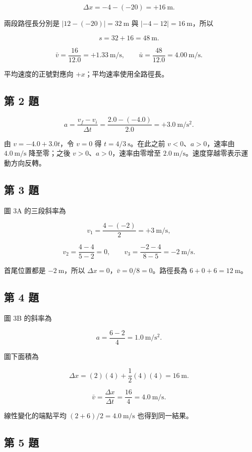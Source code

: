 \documentclass[11pt,a4paper]{article}
\begin{document}
\[
\Delta x=-4-(-20)=+16\ \mathrm m.
\]

兩段路徑長分別是 \(|12-(-20)|=32\ \mathrm m\) 與 \(|-4-12|=16\ \mathrm m\)，所以

\[
s=32+16=48\ \mathrm m.
\]

\[
\bar v=\frac{16}{12.0}=+1.33\ \mathrm{m/s},
\qquad
\bar u=\frac{48}{12.0}=4.00\ \mathrm{m/s}.
\]

平均速度的正號對應向 \(+x\)；平均速率使用全路徑長。

\subsection{第 2 題}\label{ux7b2c-2-ux984c}

\[
a=\frac{v_f-v_i}{\Delta t}
=\frac{2.0-(-4.0)}{2.0}
=+3.0\ \mathrm{m/s^2}.
\]

由 \(v=-4.0+3.0t\)，令 \(v=0\) 得 \(t=4/3\ \mathrm s\)。在此之前 \(v<0\)、\(a>0\)，速率由 \(4.0\ \mathrm{m/s}\) 降至零；之後 \(v>0\)、\(a>0\)，速率由零增至 \(2.0\ \mathrm{m/s}\)。速度穿越零表示運動方向反轉。

\subsection{第 3 題}\label{ux7b2c-3-ux984c}

圖 3A 的三段斜率為

\[
v_1=\frac{4-(-2)}{2}=+3\ \mathrm{m/s},
\]

\[
v_2=\frac{4-4}{5-2}=0,
\qquad
v_3=\frac{-2-4}{8-5}=-2\ \mathrm{m/s}.
\]

首尾位置都是 \(-2\ \mathrm m\)，所以 \(\Delta x=0\)，\(\bar v=0/8=0\)。路徑長為 \(6+0+6=12\ \mathrm m\)。

\subsection{第 4 題}\label{ux7b2c-4-ux984c}

圖 3B 的斜率為

\[
a=\frac{6-2}{4}=1.0\ \mathrm{m/s^2}.
\]

圖下面積為

\[
\Delta x=(2)(4)+\frac{1}{2}(4)(4)=16\ \mathrm m.
\]

\[
\bar v=\frac{\Delta x}{\Delta t}=\frac{16}{4}=4.0\ \mathrm{m/s}.
\]

線性變化的端點平均 \((2+6)/2=4.0\ \mathrm{m/s}\) 也得到同一結果。

\subsection{第 5 題}\label{ux7b2c-5-ux984c}
\end{document}
